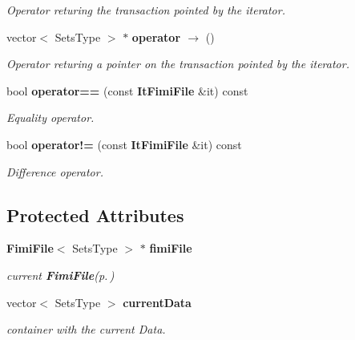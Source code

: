 \begin{CompactItemize}
\begin{CompactList}\small\item\em Operator returing the transaction pointed by the iterator. \item\end{CompactList}\item 
vector$<$ Sets\-Type $>$ $\ast$ {\bf operator $\rightarrow$ } ()\label{class_it_fimi_file_f5dce33c2c37373cfb09595d601b9180}

\begin{CompactList}\small\item\em Operator returing a pointer on the transaction pointed by the iterator. \item\end{CompactList}\item 
bool {\bf operator==} (const {\bf It\-Fimi\-File} \&it) const \label{class_it_fimi_file_ec245aaf60f7889a07fbaba20c77be51}

\begin{CompactList}\small\item\em Equality operator. \item\end{CompactList}\item 
bool {\bf operator!=} (const {\bf It\-Fimi\-File} \&it) const \label{class_it_fimi_file_29c9d50f9de562927c85aeac944d46cf}

\begin{CompactList}\small\item\em Difference operator. \item\end{CompactList}\end{CompactItemize}
\subsection*{Protected Attributes}
\begin{CompactItemize}
\item 
{\bf Fimi\-File}$<$ Sets\-Type $>$ $\ast$ {\bf fimi\-File}\label{class_it_fimi_file_9edb330d528dd195a9170c109e89c425}

\begin{CompactList}\small\item\em current {\bf Fimi\-File}{\rm (p.\,\pageref{class_fimi_file})} \item\end{CompactList}\item 
vector$<$ Sets\-Type $>$ {\bf current\-Data}\label{class_it_fimi_file_57d6d5ca0a559b25e5f53a236eb40942}

\begin{CompactList}\small\item\em container with the current Data. \item\end{CompactList}\end{CompactItemize}
